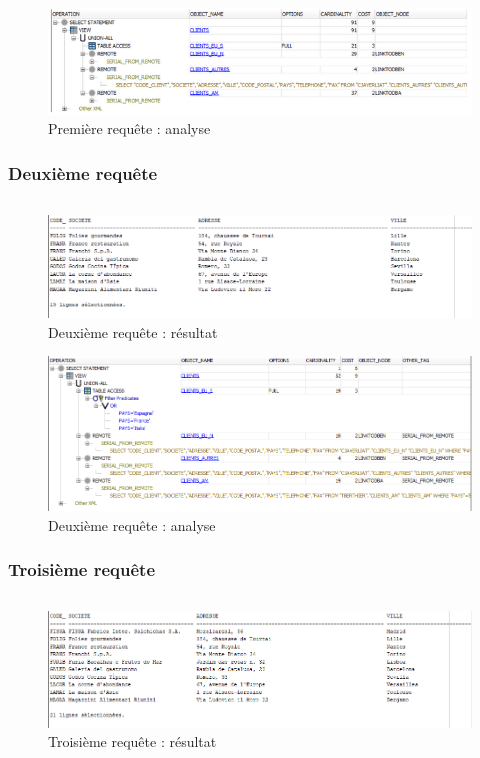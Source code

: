 \documentclass[10pt,a4paper]{article}
\theoremstyle{plain}
\begin{document}
\begin{figure}[!h]
    \centering
    \includegraphics[width=15cm]{EUS_req1_analyse.PNG}
    \caption{Première requête : analyse}
\end{figure}
\newpage

\subsubsection{Deuxième requête}
\inputminted{sql}{EUS_IV-A-2.sql}
\begin{figure}[!h]
    \centering
    \includegraphics[width=15cm]{EUS_req2.PNG}
    \caption{Deuxième requête : résultat}
\end{figure}

\begin{figure}[!h]
    \centering
    \includegraphics[width=15cm]{EUS_req2_analyse.PNG}
    \caption{Deuxième requête : analyse}
\end{figure}
\newpage

\subsubsection{Troisième requête}
\inputminted{sql}{EUS_IV-A-3.sql}
\begin{figure}[!h]
    \centering
    \includegraphics[width=15cm]{EUS_req3.PNG}
    \caption{Troisième requête : résultat}
\end{figure}
\end{document}
